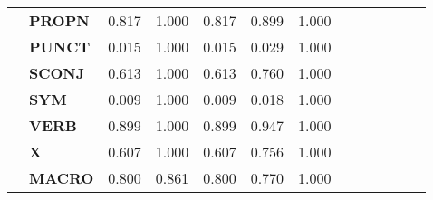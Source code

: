 \begin{longtable}{|l||l||l||l||l||l||l||l||l||l||l||l||l|}
\textbf{} & \textbf{PROPN} & 0.817 & 1.000 & 0.817 & 0.899 & 1.000 \\
\textbf{} & \textbf{PUNCT} & 0.015 & 1.000 & 0.015 & 0.029 & 1.000 \\
\textbf{} & \textbf{SCONJ} & 0.613 & 1.000 & 0.613 & 0.760 & 1.000 \\
\textbf{} & \textbf{SYM} & 0.009 & 1.000 & 0.009 & 0.018 & 1.000 \\
\textbf{} & \textbf{VERB} & 0.899 & 1.000 & 0.899 & 0.947 & 1.000 \\
\textbf{} & \textbf{X} & 0.607 & 1.000 & 0.607 & 0.756 & 1.000 \\
\textbf{} & \textbf{MACRO} & 0.800 & 0.861 & 0.800 & 0.770 & 1.000 \\
\cline{1-7}
\end{longtable}
